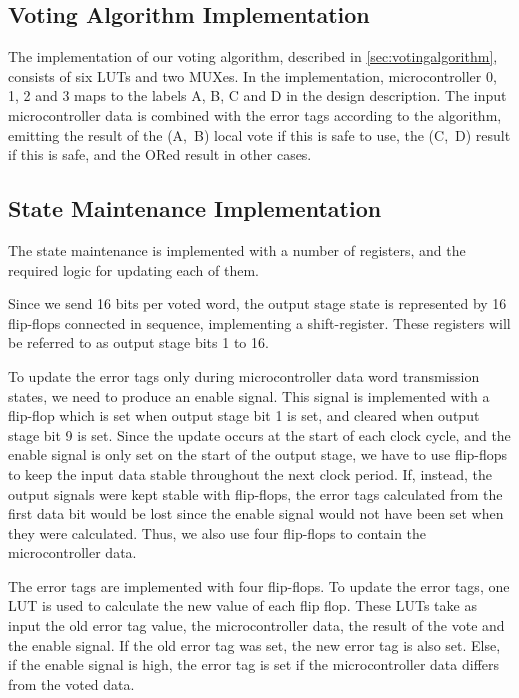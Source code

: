 \subsection{Voting Algorithm Implementation}
The implementation of our voting algorithm, described in
\autoref{sec:votingalgorithm}, consists of six LUTs and two MUXes. In
the implementation, microcontroller 0, 1, 2 and 3 maps to the labels
A, B, C and D in the design description. The input microcontroller
data is combined with the error tags according to the algorithm,
emitting the result of the (A,~B) local vote if this is safe to use,
the (C,~D) result if this is safe, and the ORed result in other cases.


\subsection{State Maintenance Implementation}
The state maintenance is implemented with a number of registers, and
the required logic for updating each of them.

Since we send 16 bits per voted word, the output stage state is
represented by 16 flip-flops connected in sequence, implementing a
shift-register. These registers will be referred to as output stage
bits 1 to 16. 

To update the error tags only during microcontroller data word
transmission states, we need to produce an enable signal. This signal
is implemented with a flip-flop which is set when output stage bit 1
is set, and cleared when output stage bit 9 is set. Since the update
occurs at the start of each clock cycle, and the enable signal is only
set on the start of the output stage, we have to use flip-flops to
keep the input data stable throughout the next clock period. If,
instead, the output signals were kept stable with flip-flops, the
error tags calculated from the first data bit would be lost since the
enable signal would not have been set when they were calculated. Thus,
we also use four flip-flops to contain the microcontroller data.

The error tags are implemented with four flip-flops. To update the
error tags, one LUT is used to calculate the new value of each flip
flop. These LUTs take as input the old error tag value, the
microcontroller data, the result of the vote and the enable
signal.  If the old error tag
was set, the new error tag is also set. Else, if the enable signal is
high, the error tag is set if the microcontroller data differs from
the voted data.

